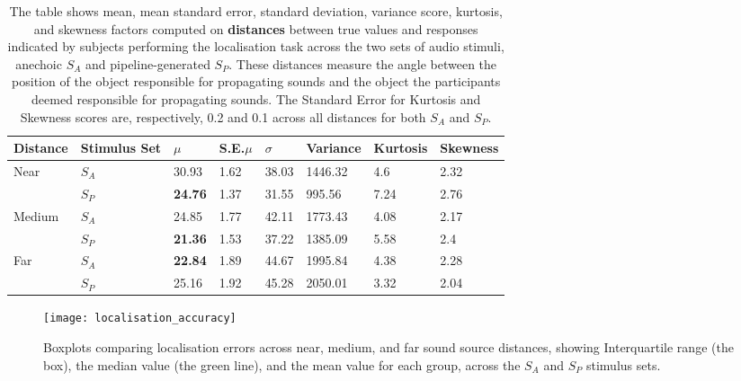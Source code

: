 \begin{table}[htbp]
\centering
\caption{The table shows mean, mean standard error, standard deviation, variance score, kurtosis, and skewness factors computed on \textbf{distances} between true values and responses indicated by subjects performing the localisation task across the two sets of audio stimuli, anechoic $S_A$ and pipeline-generated $S_P$. These distances measure the angle between the position of the object responsible for propagating sounds and the object the participants deemed responsible for propagating sounds. The Standard Error for Kurtosis and Skewness scores are, respectively, 0.2 and 0.1 across all distances for both $S_A$ and $S_P$.}\label{tab:loc-error-groups}
\begin{tabular}{@{}llllllll@{}}
\toprule
Distance                & Stimulus Set & $\mu$   & S.E.$\mu$ & $\sigma$ & Variance & Kurtosis & Skewness    \\ \midrule
\multirow{2}{*}{Near}   & $S_A$ & 30.93          & 1.62      & 38.03   & 1446.32  & 4.6        & 2.32       \\
                        & $S_P$ & \textbf{24.76} & 1.37      & 31.55   & 995.56   & 7.24       & 2.76       \\
\multirow{2}{*}{Medium} & $S_A$ & 24.85          & 1.77      & 42.11   & 1773.43  & 4.08       & 2.17       \\
                        & $S_P$ & \textbf{21.36} & 1.53      & 37.22   & 1385.09  & 5.58       & 2.4        \\
\multirow{2}{*}{Far}    & $S_A$ & \textbf{22.84} & 1.89      & 44.67   & 1995.84  & 4.38       & 2.28       \\
                        & $S_P$ & 25.16          & 1.92      & 45.28   & 2050.01  & 3.32       & 2.04       \\ \bottomrule
\end{tabular}
\end{table}

\begin{figure}[htbp]
    \centering
    \texttt{[image: localisation\_accuracy]}
    \caption[Psychoacoustic test results --- localisation error]{Boxplots comparing localisation errors across near, medium, and far sound source distances, showing Interquartile range (the box), the median value (the green line), and the mean value for each group, across the $S_A$ and $S_P$ stimulus sets.}\label{fig:localisation-acc}
\end{figure}

